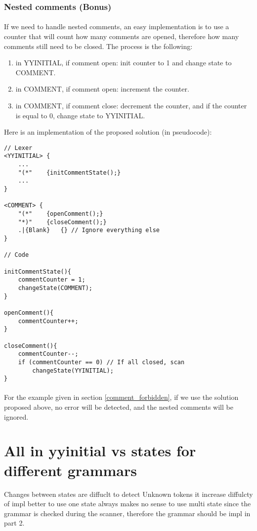 \documentclass[letterpaper]{article}
\begin{document}
\subsubsection{Nested comments (Bonus)}

\paragraph{}
If we need to handle nested comments, an easy implementation is to use a
counter that will count how many comments are opened, therefore how many
comments still need to be closed. The process is the following:
\begin{enumerate}
    \item in YYINITIAL, if comment open: init counter to 1 and change state
    to COMMENT.
    \item in COMMENT, if comment open: increment the counter.
    \item in COMMENT, if comment close: decrement the counter, and
    if the counter is equal to 0, change state to YYINITIAL.
\end{enumerate}

Here is an implementation of the proposed solution (in pseudocode): \\
\begin{lstlisting}[frame=single]
// Lexer
<YYINITIAL> {
    ...
    "(*"    {initCommentState();}
    ...
}

<COMMENT> {
    "(*"    {openComment();}
    "*)"    {closeComment();}
    .|{Blank}   {} // Ignore everything else
}

// Code

initCommentState(){
    commentCounter = 1;
    changeState(COMMENT);
}

openComment(){
    commentCounter++;
}

closeComment(){
    commentCounter--;
    if (commentCounter == 0) // If all closed, scan
        changeState(YYINITIAL);
}

\end{lstlisting}

\paragraph{}

For the example given in section \ref{comment_forbidden}, if we use the
solution proposed above, no error will be detected, and the nested
comments will be ignored.

\section{All in yyinitial vs states for different grammars}

Changes between states are diffuclt to detect Unknown tokens
it increase diffulcty of impl
better to use one state
always makes no sense to use multi state since the grammar is checked
during the scanner, therefore the grammar should be impl in part 2.
\end{document}
